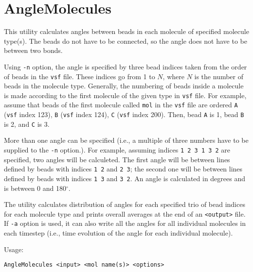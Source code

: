 \section{AngleMolecules} \label{sec:AngleMolecules}

This utility calculates angles between beads in each molecule of specified
molecule type(s). The beads do not have to be connected, so the angle does
not have to be between two bonds.

Using \texttt{-n} option, the angle is specified by three bead indices taken
from the order of beads in the \texttt{vsf} file. These indices go from 1
to $N$, where $N$ is the number of beads in the molecule type. Generally,
the numbering of beads inside a molecule is made according to the first
molecule of the given type in \texttt{vsf} file. For example, assume that
beads of the first molecule called \texttt{mol} in the \texttt{vsf} file
are ordered \texttt{A} (\texttt{vsf} index 123), \texttt{B} (\texttt{vsf}
index 124), \texttt{C} (\texttt{vsf} index 200). Then, bead \texttt{A} is
1, bead \texttt{B} is 2, and \texttt{C} is 3.

More than one angle can be specified (i.e., a multiple of three numbers
have to be supplied to the \texttt{-n} option.). For example, assuming
indices \texttt{1 2 3 1 3 2} are specified, two angles will be calculeted.
The first angle will be between lines defined by beads with indices
\texttt{1 2} and \texttt{2 3}; the second one will be between lines defined
by beads with indices \texttt{1 3} and \texttt{3 2}. An angle is calculated in
degrees and is between 0 and 180$^{\circ}$.

The utility calculates distribution of angles for each specified trio of
bead indices for each molecule type and prints overall averages at the end
of an \texttt{<output>} file. If \texttt{-a} option is used, it can also write
all the angles for all individual molecules in each timestep (i.e., time
evolution of the angle for each individual molecule).

Usage:

\vspace{1em}
\noindent
\texttt{AngleMolecules <input> <mol name(s)> <options>}

